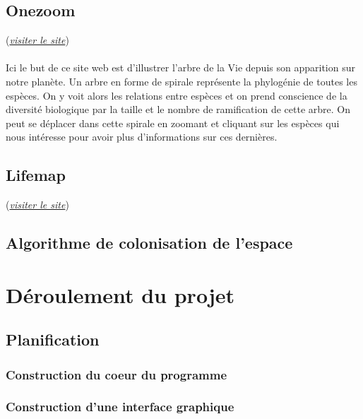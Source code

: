 \documentclass[a4paper]{article}
\begin{document}
	\subsection{Onezoom}
	(\href{http://www.onezoom.org/}{\emph{visiter le site}})
	\paragraph{}
	Ici le but de ce site web est d'illustrer l'arbre de la Vie depuis son apparition sur notre planète. Un arbre en forme de spirale représente la phylogénie de toutes les espèces. On y voit alors les relations entre espèces et on prend conscience de la diversité biologique par la taille et le nombre de ramification de cette arbre. On peut se déplacer dans cette spirale en zoomant et cliquant sur les espèces qui nous intéresse pour avoir plus d'informations sur ces dernières.    	

	\subsection{Lifemap}
	(\href{http://lifemap.univ-lyon1.fr/}{\emph{visiter le site}})
	\paragraph{}
		

	\subsection{Algorithme de colonisation de l'espace}
	\paragraph{}


\section{Déroulement du projet}
	
	\subsection{Planification}

		
		\subsubsection{Construction du coeur du programme}

			

		\subsubsection{Construction d’une interface graphique}
\end{document}
